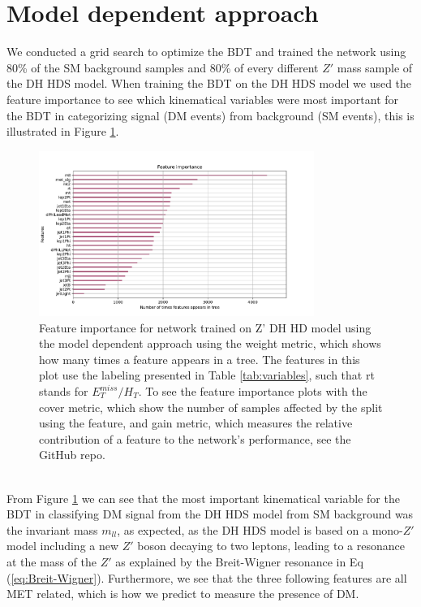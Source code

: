 \documentclass[12pt, a4paper]{book}
\begin{document}
\graphicspath{{../../../Plots/}}
\section{Model dependent approach}\label{sec:Walkthrough}
We conducted a grid search to optimize the BDT and trained the network using 80\% of the SM background samples and 80\% of every different $Z'$ mass sample of the DH HDS model. When training the BDT on the DH HDS model we used the feature importance to see which kinematical variables were most important for the BDT in 
categorizing signal (DM events) from background (SM events), this is illustrated in Figure \ref{fig:DH_HDS_feat}. 
\begin{figure}[!ht]
	\centering
      \includegraphics[width=0.8\textwidth]{XGBoost/DH_HDS/feature_importance/weight.pdf}
   \caption[Feature importance for network trained on Z' DH HD model using the model dependent approach]{Feature importance for network trained on Z' DH HD model using the model dependent approach using the weight metric, which shows how many times a feature appears in a tree. The features in this plot use the labeling presented in Table \ref{tab:variables}, such that rt stands for $E_T^{miss}/H_T$. 
   To see the feature importance plots with the cover metric, which show the number of samples affected by the split using the feature, and gain metric, which measures the relative contribution of a feature to the network's performance, see the GitHub repo.}\label{fig:DH_HDS_feat}
\end{figure}
\\From Figure \ref{fig:DH_HDS_feat} we can see that the most important kinematical variable for the BDT in classifying DM signal from the DH HDS model from SM background was the invariant mass $m_{ll}$, as expected, as the DH HDS model is based 
on a mono-$Z'$ model including a new $Z'$ boson decaying to two leptons, leading to a resonance at the mass of the $Z'$ as explained by the Breit-Wigner resonance in Eq (\ref{eq:Breit-Wigner}). Furthermore, we see that the three following features are all MET related, which is how we predict to measure the presence of DM. 
\end{document}
